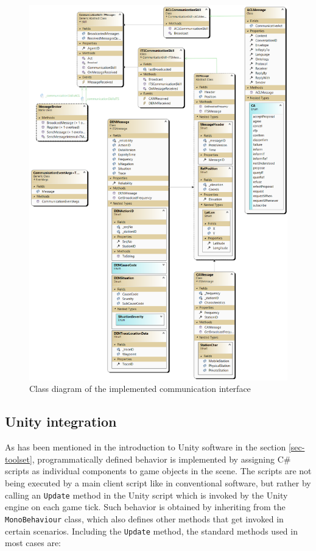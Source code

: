 \documentclass[0main.tex]{subfiles}
\begin{document}
\begin{figure}[htbp]
    \centering
    \includegraphics[width=.99\textwidth]{mas-its-communication.png}
    \caption{Class diagram of the implemented communication interface}
    \label{fig-classes-comm}
\end{figure}

\subsection{Unity integration}

As has been mentioned in the introduction to Unity software in the section \ref{sec-toolset}, programmatically 
defined behavior is implemented by assigning C\# scripts as individual components to game objects in 
the scene. The scripts are not being executed by a main client script like in conventional software, but 
rather by calling an \texttt{Update} method in the Unity script which is invoked by the Unity engine 
on each game tick. Such behavior is obtained by inheriting from the \texttt{MonoBehaviour} class, which 
also defines other methods that get invoked in certain scenarios. Including the \texttt{Update}
method, the standard methods used in most cases are:
\end{document}
